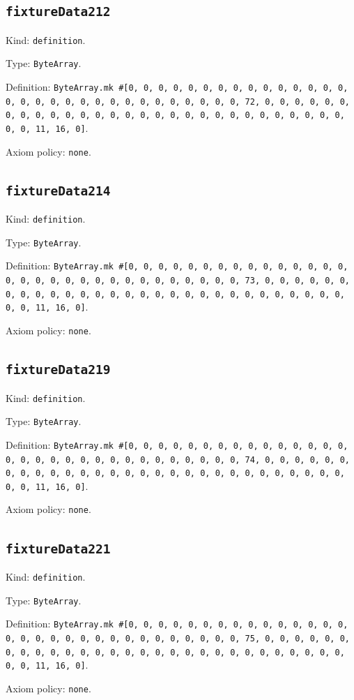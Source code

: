 \documentclass[11pt]{article}
\begin{document}
\subsection*{\texttt{fixtureData212}}
\noindent Kind: \texttt{definition}.\par
\noindent Type: \texttt{ByteArray}.\par
\noindent Definition: \texttt{ByteArray.mk \#[0, 0, 0, 0, 0, 0, 0, 0, 0, 0, 0, 0, 0, 0, 0, 0, 0, 0, 0, 0, 0, 0, 0, 0, 0, 0, 0, 0, 0, 0, 0, 72, 0, 0, 0, 0, 0, 0, 0, 0, 0, 0, 0, 0, 0, 0, 0, 0, 0, 0, 0, 0, 0, 0, 0, 0, 0, 0, 0, 0, 0, 0, 0, 11, 16, 0]}.\par
\noindent Axiom policy: \texttt{none}.\par
\subsection*{\texttt{fixtureData214}}
\noindent Kind: \texttt{definition}.\par
\noindent Type: \texttt{ByteArray}.\par
\noindent Definition: \texttt{ByteArray.mk \#[0, 0, 0, 0, 0, 0, 0, 0, 0, 0, 0, 0, 0, 0, 0, 0, 0, 0, 0, 0, 0, 0, 0, 0, 0, 0, 0, 0, 0, 0, 0, 73, 0, 0, 0, 0, 0, 0, 0, 0, 0, 0, 0, 0, 0, 0, 0, 0, 0, 0, 0, 0, 0, 0, 0, 0, 0, 0, 0, 0, 0, 0, 0, 11, 16, 0]}.\par
\noindent Axiom policy: \texttt{none}.\par
\subsection*{\texttt{fixtureData219}}
\noindent Kind: \texttt{definition}.\par
\noindent Type: \texttt{ByteArray}.\par
\noindent Definition: \texttt{ByteArray.mk \#[0, 0, 0, 0, 0, 0, 0, 0, 0, 0, 0, 0, 0, 0, 0, 0, 0, 0, 0, 0, 0, 0, 0, 0, 0, 0, 0, 0, 0, 0, 0, 74, 0, 0, 0, 0, 0, 0, 0, 0, 0, 0, 0, 0, 0, 0, 0, 0, 0, 0, 0, 0, 0, 0, 0, 0, 0, 0, 0, 0, 0, 0, 0, 11, 16, 0]}.\par
\noindent Axiom policy: \texttt{none}.\par
\subsection*{\texttt{fixtureData221}}
\noindent Kind: \texttt{definition}.\par
\noindent Type: \texttt{ByteArray}.\par
\noindent Definition: \texttt{ByteArray.mk \#[0, 0, 0, 0, 0, 0, 0, 0, 0, 0, 0, 0, 0, 0, 0, 0, 0, 0, 0, 0, 0, 0, 0, 0, 0, 0, 0, 0, 0, 0, 0, 75, 0, 0, 0, 0, 0, 0, 0, 0, 0, 0, 0, 0, 0, 0, 0, 0, 0, 0, 0, 0, 0, 0, 0, 0, 0, 0, 0, 0, 0, 0, 0, 11, 16, 0]}.\par
\noindent Axiom policy: \texttt{none}.\par
\end{document}
